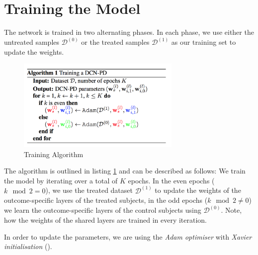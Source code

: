 \section{Training the Model} \label{sec:dcn-training}
The network is trained in two alternating phases. In each phase, we use either the untreated samples $\mathcal{D}^{(0)}$ or the treated samples $\mathcal{D}^{(1)}$ as our training set to update the weights. 

\begin{figure}[h]
	\centering
	\includegraphics[width=0.7\textwidth]{figures/chapter-3/training-algorithm.png}
	\caption{Training Algorithm}\label{fig:training-algorithm}
\end{figure}

The algorithm is outlined in listing \ref{fig:training-algorithm} and can be described as follows: We train the model by iterating over a total of $K$ epochs. In the even epochs ($k \mod 2 = 0$), we use the treated dataset $\mathcal{D}^{(1)}$ to update the weights of the outcome-specific layers of the treated subjects, in the odd epochs ($k \mod 2 \neq 0$) we learn the outcome-specific layers of the control subjects using $\mathcal{D}^{(0)}$. Note, how the weights of the shared layers are trained in every iteration.


In order to update the parameters, we are using the \emph{Adam optimiser} with \emph{Xavier initialisation} (\cite{adam}).


